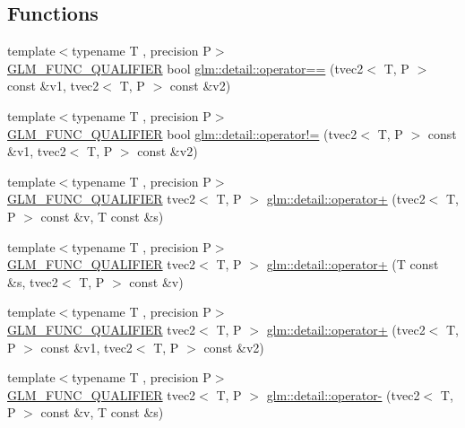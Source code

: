 \subsection*{Functions}
\begin{DoxyCompactItemize}
\item 
{\footnotesize template$<$typename T , precision P$>$ }\\\hyperlink{setup_8hpp_a33fdea6f91c5f834105f7415e2a64407}{G\+L\+M\+\_\+\+F\+U\+N\+C\+\_\+\+Q\+U\+A\+L\+I\+F\+I\+ER} bool \hyperlink{namespaceglm_1_1detail_a791393aaaed7c0bd3e34388721150b9b}{glm\+::detail\+::operator==} (tvec2$<$ T, P $>$ const \&v1, tvec2$<$ T, P $>$ const \&v2)
\item 
{\footnotesize template$<$typename T , precision P$>$ }\\\hyperlink{setup_8hpp_a33fdea6f91c5f834105f7415e2a64407}{G\+L\+M\+\_\+\+F\+U\+N\+C\+\_\+\+Q\+U\+A\+L\+I\+F\+I\+ER} bool \hyperlink{namespaceglm_1_1detail_a3cd5bb4ed1d1af297b5e7fe4c7f9ca58}{glm\+::detail\+::operator!=} (tvec2$<$ T, P $>$ const \&v1, tvec2$<$ T, P $>$ const \&v2)
\item 
{\footnotesize template$<$typename T , precision P$>$ }\\\hyperlink{setup_8hpp_a33fdea6f91c5f834105f7415e2a64407}{G\+L\+M\+\_\+\+F\+U\+N\+C\+\_\+\+Q\+U\+A\+L\+I\+F\+I\+ER} tvec2$<$ T, P $>$ \hyperlink{namespaceglm_1_1detail_afddde579237184b679bf829e01eeeeef}{glm\+::detail\+::operator+} (tvec2$<$ T, P $>$ const \&v, T const \&s)
\item 
{\footnotesize template$<$typename T , precision P$>$ }\\\hyperlink{setup_8hpp_a33fdea6f91c5f834105f7415e2a64407}{G\+L\+M\+\_\+\+F\+U\+N\+C\+\_\+\+Q\+U\+A\+L\+I\+F\+I\+ER} tvec2$<$ T, P $>$ \hyperlink{namespaceglm_1_1detail_a84048897a748fef4a49cabb657016068}{glm\+::detail\+::operator+} (T const \&s, tvec2$<$ T, P $>$ const \&v)
\item 
{\footnotesize template$<$typename T , precision P$>$ }\\\hyperlink{setup_8hpp_a33fdea6f91c5f834105f7415e2a64407}{G\+L\+M\+\_\+\+F\+U\+N\+C\+\_\+\+Q\+U\+A\+L\+I\+F\+I\+ER} tvec2$<$ T, P $>$ \hyperlink{namespaceglm_1_1detail_a048df469845c0022df3f09839b175a61}{glm\+::detail\+::operator+} (tvec2$<$ T, P $>$ const \&v1, tvec2$<$ T, P $>$ const \&v2)
\item 
{\footnotesize template$<$typename T , precision P$>$ }\\\hyperlink{setup_8hpp_a33fdea6f91c5f834105f7415e2a64407}{G\+L\+M\+\_\+\+F\+U\+N\+C\+\_\+\+Q\+U\+A\+L\+I\+F\+I\+ER} tvec2$<$ T, P $>$ \hyperlink{namespaceglm_1_1detail_a2def634027dd442fc18b2ac7ebb3fb70}{glm\+::detail\+::operator-\/} (tvec2$<$ T, P $>$ const \&v, T const \&s)

\end{DoxyCompactItemize}
